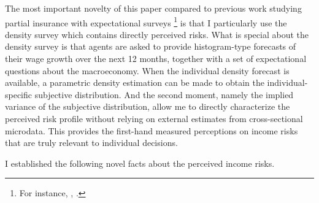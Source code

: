 The most important novelty of this paper compared to previous work studying partial insurance with expectational surveys \footnote{For instance, \cite{pistaferri_superior_2001}, \cite{kaufmann_disentangling_2009}.} is that I particularly use the density survey which contains directly perceived risks.  What is special about the density survey is that agents are asked to provide histogram-type forecasts of their wage growth over the next 12 months, together with a set of expectational questions about the macroeconomy. When the individual density forecast is available, a parametric density estimation can be made to obtain the individual-specific subjective distribution. And the second moment, namely the implied variance of the subjective distribution, allow me to directly characterize the perceived risk profile without relying on external estimates from cross-sectional microdata. This provides the first-hand measured perceptions on income risks that are truly relevant to individual decisions.

I established the following novel facts about the perceived income risks.

